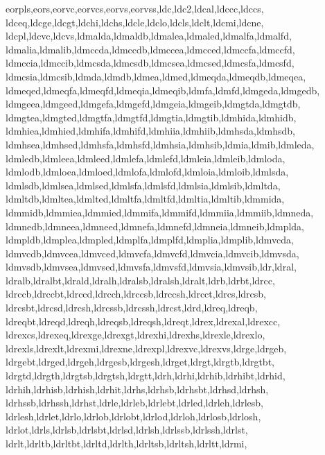 {{      eorpls,eors,eorvc,eorvcs,eorvs,eorvss,ldc,ldc2,ldcal,ldccc,ldccs,       %
      ldceq,ldcge,ldcgt,ldchi,ldchs,ldcle,ldclo,ldcls,ldclt,ldcmi,ldcne,      %
      ldcpl,ldcvc,ldcvs,ldmalda,ldmaldb,ldmalea,ldmaled,ldmalfa,ldmalfd,      %
      ldmalia,ldmalib,ldmccda,ldmccdb,ldmccea,ldmcced,ldmccfa,ldmccfd,        %
      ldmccia,ldmccib,ldmcsda,ldmcsdb,ldmcsea,ldmcsed,ldmcsfa,ldmcsfd,        %
      ldmcsia,ldmcsib,ldmda,ldmdb,ldmea,ldmed,ldmeqda,ldmeqdb,ldmeqea,        %
      ldmeqed,ldmeqfa,ldmeqfd,ldmeqia,ldmeqib,ldmfa,ldmfd,ldmgeda,ldmgedb,    %
      ldmgeea,ldmgeed,ldmgefa,ldmgefd,ldmgeia,ldmgeib,ldmgtda,ldmgtdb,        %
      ldmgtea,ldmgted,ldmgtfa,ldmgtfd,ldmgtia,ldmgtib,ldmhida,ldmhidb,        %
      ldmhiea,ldmhied,ldmhifa,ldmhifd,ldmhiia,ldmhiib,ldmhsda,ldmhsdb,        %
      ldmhsea,ldmhsed,ldmhsfa,ldmhsfd,ldmhsia,ldmhsib,ldmia,ldmib,ldmleda,    %
      ldmledb,ldmleea,ldmleed,ldmlefa,ldmlefd,ldmleia,ldmleib,ldmloda,        %
      ldmlodb,ldmloea,ldmloed,ldmlofa,ldmlofd,ldmloia,ldmloib,ldmlsda,        %
      ldmlsdb,ldmlsea,ldmlsed,ldmlsfa,ldmlsfd,ldmlsia,ldmlsib,ldmltda,        %
      ldmltdb,ldmltea,ldmlted,ldmltfa,ldmltfd,ldmltia,ldmltib,ldmmida,        %
      ldmmidb,ldmmiea,ldmmied,ldmmifa,ldmmifd,ldmmiia,ldmmiib,ldmneda,        %
      ldmnedb,ldmneea,ldmneed,ldmnefa,ldmnefd,ldmneia,ldmneib,ldmplda,        %
      ldmpldb,ldmplea,ldmpled,ldmplfa,ldmplfd,ldmplia,ldmplib,ldmvcda,        %
      ldmvcdb,ldmvcea,ldmvced,ldmvcfa,ldmvcfd,ldmvcia,ldmvcib,ldmvsda,        %
      ldmvsdb,ldmvsea,ldmvsed,ldmvsfa,ldmvsfd,ldmvsia,ldmvsib,ldr,ldral,      %
      ldralb,ldralbt,ldrald,ldralh,ldralsb,ldralsh,ldralt,ldrb,ldrbt,ldrcc,   %
      ldrccb,ldrccbt,ldrccd,ldrcch,ldrccsb,ldrccsh,ldrcct,ldrcs,ldrcsb,       %
      ldrcsbt,ldrcsd,ldrcsh,ldrcssb,ldrcssh,ldrcst,ldrd,ldreq,ldreqb,         %
      ldreqbt,ldreqd,ldreqh,ldreqsb,ldreqsh,ldreqt,ldrex,ldrexal,ldrexcc,     %
      ldrexcs,ldrexeq,ldrexge,ldrexgt,ldrexhi,ldrexhs,ldrexle,ldrexlo,        %
      ldrexls,ldrexlt,ldrexmi,ldrexne,ldrexpl,ldrexvc,ldrexvs,ldrge,ldrgeb,   %
      ldrgebt,ldrged,ldrgeh,ldrgesb,ldrgesh,ldrget,ldrgt,ldrgtb,ldrgtbt,      %
      ldrgtd,ldrgth,ldrgtsb,ldrgtsh,ldrgtt,ldrh,ldrhi,ldrhib,ldrhibt,ldrhid,  %
      ldrhih,ldrhisb,ldrhish,ldrhit,ldrhs,ldrhsb,ldrhsbt,ldrhsd,ldrhsh,       %
      ldrhssb,ldrhssh,ldrhst,ldrle,ldrleb,ldrlebt,ldrled,ldrleh,ldrlesb,      %
      ldrlesh,ldrlet,ldrlo,ldrlob,ldrlobt,ldrlod,ldrloh,ldrlosb,ldrlosh,      %
      ldrlot,ldrls,ldrlsb,ldrlsbt,ldrlsd,ldrlsh,ldrlssb,ldrlssh,ldrlst,       %
      ldrlt,ldrltb,ldrltbt,ldrltd,ldrlth,ldrltsb,ldrltsh,ldrltt,ldrmi,        %
}}
